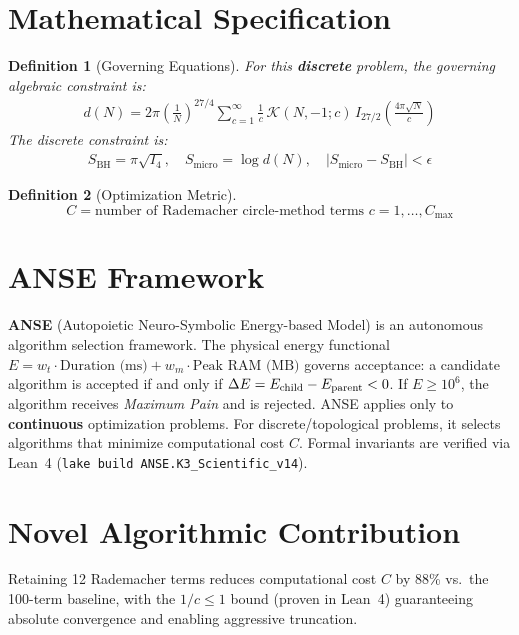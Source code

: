 \documentclass[11pt,a4paper]{article}
\newtheorem{definition}{Definition}
\begin{document}
\section{Mathematical Specification}
\begin{definition}[Governing Equations]
For this \textbf{discrete} problem, the governing algebraic constraint is:
\begin{align}
d(N) = 2\pi \left(\frac{1}{N}\right)^{27/4} \sum_{c=1}^{\infty} \frac{1}{c} \, \mathcal{K}(N,-1;c) \, I_{27/2}\!\left(\frac{4\pi\sqrt{N}}{c}\right)
\end{align}
The discrete constraint is:
\begin{align}
S_{\mathrm{BH}} = \pi \sqrt{I_4}, \quad S_{\mathrm{micro}} = \log d(N), \quad |S_{\mathrm{micro}} - S_{\mathrm{BH}}| < \epsilon
\end{align}
\end{definition}

\begin{definition}[Optimization Metric]
\[
C = \text{number of Rademacher circle-method terms } c = 1, \ldots, C_{\max}
\]
\end{definition}

\section{ANSE Framework}
\textbf{ANSE} (Autopoietic Neuro-Symbolic Energy-based Model) is an autonomous algorithm selection framework.
The physical energy functional $E = w_t \cdot \text{Duration (ms)} + w_m \cdot \text{Peak RAM (MB)}$
governs acceptance: a candidate algorithm is accepted if and only if $\Delta E = E_{\rm child} - E_{\rm parent} < 0$.
If $E \ge 10^6$, the algorithm receives \emph{Maximum Pain} and is rejected.
ANSE applies only to \textbf{continuous} optimization problems.
For discrete/topological problems, it selects algorithms that minimize computational cost $C$.
Formal invariants are verified via Lean~4 (\texttt{lake build ANSE.K3\_Scientific\_v14}).

\section{Novel Algorithmic Contribution}
Retaining 12 Rademacher terms reduces computational cost $C$ by 88\% vs.~the 100-term baseline, with the $1/c \le 1$ bound (proven in Lean~4) guaranteeing absolute convergence and enabling aggressive truncation.
\end{document}
